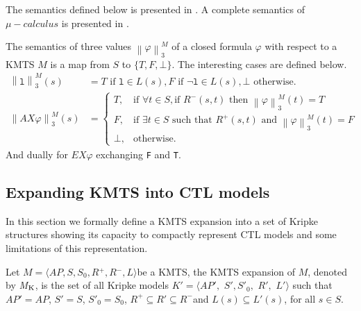 \documentclass{llncs}
\def\llb{\left\|}
\def\rrb{\right\|}
\newcommand{\ksdef}[1][]{{{$K{#1} = \langle AP{#1},$ $ S{#1}, S{#1}_{0}, $ $ R{#1},$ $ L{#1} \rangle$\;}}}
\newcommand{\kmtsdef}[1][]{{{$M{#1} = \langle AP{#1}, S{#1}, S{#1}_{0}, R{#1}^{+}, R{#1}^{-}, L{#1} \rangle$}\;}}
\begin{document}

The semantics defined below is presented in \cite{Gru11}. A complete semantics of $\mu-calculus$ is presented in \cite{GLLS07}.%

\begin{definition}
The semantics of three values $\left\|\varphi\right\|^{M}_{3}$ of a  closed formula $\varphi$ with respect to a KMTS $M$ is a map from $S$ to ${\{T, F, \bot\}}$. The interesting cases are defined below. 
\begin{align*}
\llb \texttt{l} \rrb^M_3(s) &= T \mbox{ if } \texttt{l} \in L(s), F \mbox{ if } \neg \texttt{l} \in L(s), \bot \mbox{ otherwise}.\\
\llb AX \varphi \rrb^M_3(s) &= \begin{cases} 	
									T, & \mbox{if } \forall t \in S, \mbox{if } R^{-}(s,t) 
										\mbox{ then } \llb\varphi\rrb^M_3(t) = T \\ 
									F, & \mbox{if } \exists t \in S \mbox{ such that } R^{+}(s,t) 
										\mbox{ and } \llb\varphi\rrb^M_3(t) = F \\ 
									\bot, & \mbox{otherwise}.
								\end{cases}
\end{align*}
And dually for $EX\varphi$ exchanging \texttt{F} and \texttt{T}. 
\end{definition}

\subsection{Expanding KMTS into CTL models}

In this section we formally define a KMTS expansion into a set of Kripke structures showing its capacity to compactly represent CTL models and some limitations of this representation.

\begin{definition}
Let \kmtsdef be a KMTS, the KMTS expansion of $M$, denoted by \emph{M$_{\mbox{\scriptsize K}}$}, is the set of all Kripke models \ksdef['] such that $AP'=AP$, $S'=S$, $S'_{0}=S_{0}$, $R^+ \subseteq R' \subseteq R^-$and $L(s) \subseteq L'(s)$, for all $s \in S$.  
\end{definition}
\end{document}
